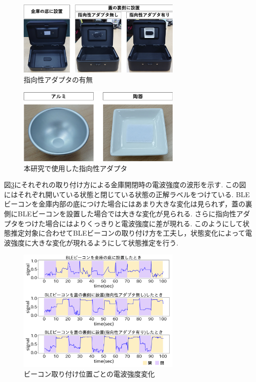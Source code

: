\documentclass[Japanese]{dicomopapers}
\begin{document}
\begin{figure}[tbh]
    \centering
    \includegraphics[width=8cm]{adapta_compare2.png}
    \caption{指向性アダプタの有無}
    \label{adapter}
\end{figure}

\begin{figure}[tbh]
    \centering
    \includegraphics[width=8cm]{adapta.png}
    \caption{本研究で使用した指向性アダプタ}
    \label{adapter_only}
\end{figure}

図\ref{transform-data}にそれぞれの取り付け方による金庫開閉時の電波強度の波形を示す.
この図にはそれぞれ開いている状態と閉じている状態の正解ラベルをつけている.
BLEビーコンを金庫内部の底につけた場合にはあまり大きな変化は見られず，蓋の裏側にBLEビーコンを設置した場合では大きな変化が見られる.
さらに指向性アダプタをつけた場合にはよりくっきりと電波強度に差が現れる.
このようにして状態推定対象に合わせてBLEビーコンの取り付け方を工夫し，状態変化によって電波強度に大きな変化が現れるようにして状態推定を行う.


\begin{figure}[tbh]
    \centering
    \includegraphics[width=8cm]{in-out.png}
    \caption{ビーコン取り付け位置ごとの電波強度変化}
    \label{transform-data}
\end{figure}
\end{document}
